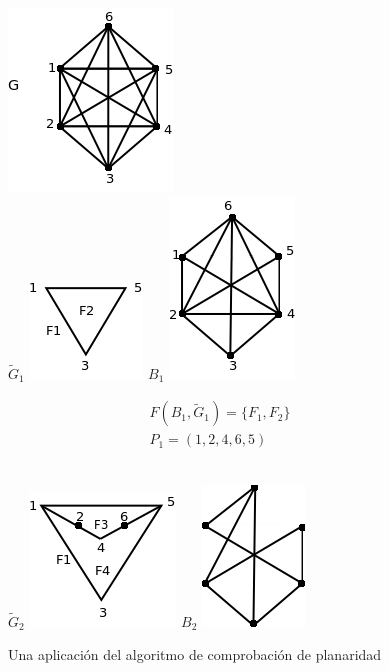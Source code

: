 \documentclass[10pt,a5paper]{book}
\begin{document}
\begin{figure}[H]
\caption{Una aplicación del algoritmo de comprobación de planaridad}
\hspace*{1in}\includegraphics[scale=.3]{Fig3_21_a.png}\\
$\widetilde{G}_1$ \includegraphics[scale=.3]{Fig3_21_b2.png}
\quad $B_1$ \includegraphics[scale=.3]{Fig3_21_b1.png}
\quad \parbox{1cm}{
\begin{align}
F(B_1,\widetilde{G}_1) = \{F_1,F_2\}\nonumber\\
P_1 = (1,2,4,6,5)\nonumber
\end{align}}\\
$\widetilde{G}_2$ \includegraphics[scale=.3]{Fig3_21_c1.png}
\quad $B_2$ \includegraphics[scale=.3]{Fig3_21_c2.png}

\end{figure}
\end{document}
